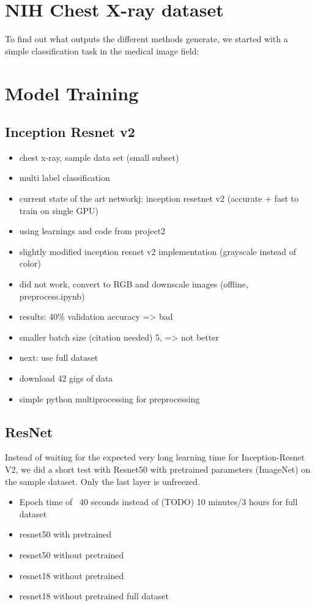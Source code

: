 \section{NIH Chest X-ray dataset}
To find out what outputs the different methods generate, we started with a simple classification task in the medical image field:

\section{Model Training}



\subsection{Inception Resnet v2}
\begin{itemize}
    \item  chest x-ray, sample data set (small subset)
    \item  multi label classification
    \item  current state of the art networkj: inception  resetnet v2 (accurate + fast to train on single GPU) \cite{todo}
    \item  using learnings and code from project2
    \item  slightly modified inception resnet v2 implementation (grayscale instead of color)
    \item  did not work, convert to RGB and downscale images (offline, preprocess.ipynb)
    \item  results: 40\% validation accuracy => bad
    \item smaller batch size (citation needed) 5, => not better
    \item next: use full dataset
    \item download 42 gigs of data
    \item simple python multiprocessing for preprocessing
\end{itemize}

\subsection{ResNet}
Instead of waiting for the expected very long learning time for Inception-Resnet V2, we did a short test with Resnet50 with pretrained parameters (ImageNet) on the sample dataset. Only the last layer is unfreezed.

\begin{itemize}
    \item Epoch time of ~40 seconds instead of (TODO) 10 minutes/3 hours for full dataset
    \item resnet50 with pretrained
    \item resnet50 without pretrained
    \item resnet18 without pretrained
    \item resnet18 without pretrained full dataset
\end{itemize}

